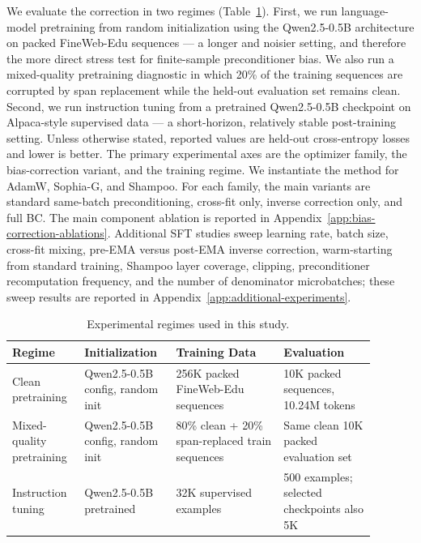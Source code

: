 \documentclass{article}
\begin{document}
We evaluate the correction in two regimes (Table~\ref{tab:experiment-setup}). First, we run language-model pretraining from random initialization using the Qwen2.5-0.5B architecture on packed FineWeb-Edu sequences --- a longer and noisier setting, and therefore the more direct stress test for finite-sample preconditioner bias. We also run a mixed-quality pretraining diagnostic in which 20\% of the training sequences are corrupted by span replacement while the held-out evaluation set remains clean. Second, we run instruction tuning from a pretrained Qwen2.5-0.5B checkpoint on Alpaca-style supervised data --- a short-horizon, relatively stable post-training setting. Unless otherwise stated, reported values are held-out cross-entropy losses and lower is better. The primary experimental axes are the optimizer family, the bias-correction variant, and the training regime. We instantiate the method for AdamW, Sophia-G, and Shampoo. For each family, the main variants are standard same-batch preconditioning, cross-fit only, inverse correction only, and full BC. The main component ablation is reported in Appendix~\ref{app:bias-correction-ablations}. Additional SFT studies sweep learning rate, batch size, cross-fit mixing, pre-EMA versus post-EMA inverse correction, warm-starting from standard training, Shampoo layer coverage, clipping, preconditioner recomputation frequency, and the number of denominator microbatches; these sweep results are reported in Appendix~\ref{app:additional-experiments}.

\begin{table}[t]
\centering
\footnotesize
\setlength{\tabcolsep}{2pt}
\caption{Experimental regimes used in this study.}
\label{tab:experiment-setup}
\begin{tabular}{p{0.17\linewidth}p{0.22\linewidth}p{0.27\linewidth}p{0.23\linewidth}}
\toprule
\rowcolor{headergray}
\textbf{Regime} & \textbf{Initialization} & \textbf{Training Data} & \textbf{Evaluation} \\
\midrule
Clean pretraining & Qwen2.5-0.5B config, random init & 256K packed FineWeb-Edu sequences & 10K packed sequences, 10.24M tokens \\
Mixed-quality pretraining & Qwen2.5-0.5B config, random init & 80\% clean + 20\% span-replaced train sequences & Same clean 10K packed evaluation set \\
Instruction tuning & Qwen2.5-0.5B pretrained & 32K supervised examples & 500 examples; selected checkpoints also 5K \\
\bottomrule
\end{tabular}
\end{table}
\end{document}
